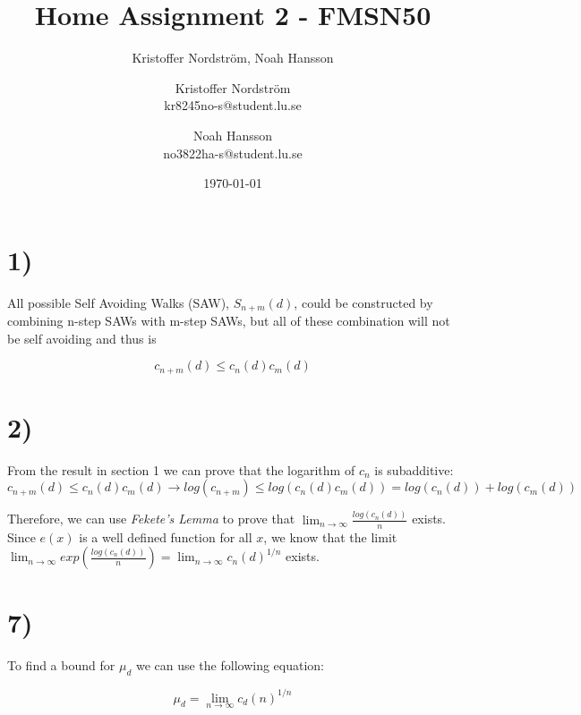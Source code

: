 \documentclass[a4paper]{article}
\title{Home Assignment 2 - FMSN50}
\author{Kristoffer Nordström, Noah Hansson}\author{Kristoffer Nordström \\ kr8245no-s@student.lu.se \and  Noah Hansson \\ no3822ha-s@student.lu.se}
\date{\today}
\begin{document}
\maketitle
\newpage

\section*{1)}

All possible Self Avoiding Walks (SAW), $S_{n+m}(d)$, could be constructed by combining n-step SAWs with m-step SAWs, but all of these combination will not be self avoiding and thus is

\begin{equation}
    \label{eq:multiplicity}
    c_{n+m}(d)\leq c_n(d)c_m(d)
\end{equation}

\section*{2)}
From the result in section 1 we can prove that the logarithm of $c_n$ is subadditive:
\begin{equation}
    c_{n+m}(d) \leq c_n(d)c_m(d) \rightarrow log(c_{n+m}) \leq log(c_n(d)c_m(d)) = log(c_n(d)) + log(c_m(d))
\end{equation}

 Therefore, we can use \textit{Fekete's Lemma} to prove that $\lim_{n\rightarrow\infty} \frac{log(c_n(d))}{n}$ exists. Since $e(x)$ is a well defined function for all $x$, we know that the limit $\lim_{n\rightarrow\infty} exp(\frac{log(c_n(d))}{n}) = \lim_{n\rightarrow\infty} c_n(d)^{1/n}$ exists. 

 \section*{7)}

 To find a bound for $\mu_d$ we can use the following equation:

\begin{equation}
    \label{eq:limit}
     \mu_d = \lim_{n \to \infty} c_d(n)^{1/n}
\end{equation}
\end{document}
